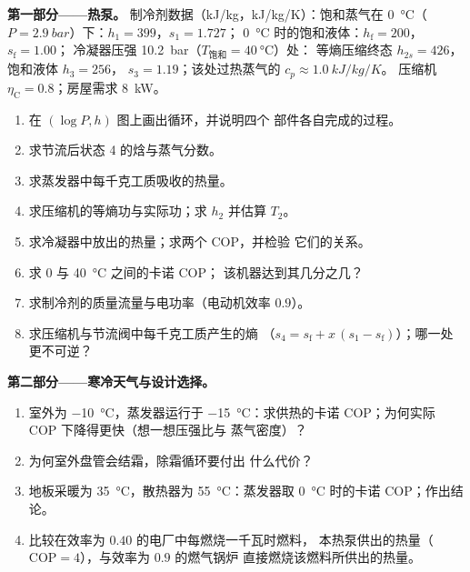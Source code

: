 \begin{problem}\label{pb:b2:open-systems:1}
\textbf{第一部分——热泵。}
制冷剂数据（\unit{kJ/kg}，\unit{kJ/kg/K}）：饱和蒸气在
\qty{0}{\celsius}（$P = \qty{2.9}{bar}$）下：$h_1 = 399$，$s_1 = 1.727$；
\qty{0}{\celsius} 时的饱和液体：$h_{\text{f}} = 200$，$s_{\text{f}} = 1.00$；
冷凝器压强 \qty{10.2}{bar}（$T_{\text{饱和}} = \qty{40}{\celsius}$）处：
等熵压缩终态 $h_{2s} = 426$，饱和液体 $h_3 = 256$，
$s_3 = 1.19$；该处过热蒸气的 $c_p \approx \qty{1.0}{kJ/kg/K}$。
压缩机 $\eta_{\text{C}} = 0.8$；房屋需求 \qty{8}{kW}。
\begin{enumerate}
  \item 在 $(\log P, h)$ 图上画出循环，并说明四个
        部件各自完成的过程。
  \item 求节流后状态 4 的焓与蒸气分数。
  \item 求蒸发器中每千克工质吸收的热量。
  \item 求压缩机的等熵功与实际功；求 $h_2$ 并估算
        $T_2$。
  \item 求冷凝器中放出的热量；求两个 COP，并检验
        它们的关系。
  \item 求 \qty{0}{} 与 \qty{40}{\celsius} 之间的卡诺 COP；
        该机器达到其几分之几？
  \item 求制冷剂的质量流量与电功率（电动机效率
        $0.9$）。
  \item 求压缩机与节流阀中每千克工质产生的熵
        （$s_4 = s_{\text{f}} + x\,(s_1 - s_{\text{f}})$）；哪一处
        更不可逆？
\end{enumerate}

\textbf{第二部分——寒冷天气与设计选择。}
\begin{enumerate}[resume]
  \item 室外为 \qty{-10}{\celsius}，蒸发器运行于
        \qty{-15}{\celsius}：求供热的卡诺 COP；为何实际
        COP 下降得更快（想一想压强比与
        蒸气密度）？
  \item 为何室外盘管会结霜，除霜循环要付出
        什么代价？
  \item 地板采暖为 \qty{35}{\celsius}，散热器为
        \qty{55}{\celsius}：蒸发器取
        \qty{0}{\celsius} 时的卡诺 COP；作出结论。
  \item 比较在效率为 $0.40$ 的电厂中每燃烧一千瓦时燃料，
        本热泵供出的热量（$\mathrm{COP}
        = 4$），与效率为 $0.9$ 的燃气锅炉
        直接燃烧该燃料所供出的热量。
\end{enumerate}


\end{problem}
